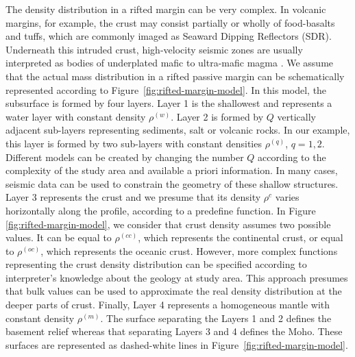 \documentclass[manuscript]{geophysics}
\begin{document}
The density distribution in a rifted margin can be very complex.
In volcanic margins, for example, the crust may consist partially or wholly of 
food-basalts and tuffs, which are commonly imaged as Seaward Dipping Reflectors (SDR).
Underneath this intruded crust, high-velocity seismic zones are usually interpreted 
as bodies of underplated mafic to ultra-mafic magma \citep{geoffroy2005}.
We assume that the actual mass distribution in a rifted passive margin can be 
schematically represented according to Figure~\ref{fig:rifted-margin-model}. 
In this model, the subsurface is formed by four layers. 
Layer 1 is the shallowest and represents a water layer with constant density
$\rho^{(w)}$. 
Layer 2 is formed by $Q$ vertically adjacent sub-layers representing 
sediments, salt or volcanic rocks.
In our example, this layer is formed by two sub-layers with constant densities
$\rho^{(q)}$, $q = 1, 2$. Different models can be created by changing the number $Q$
according to the complexity of the study area and available a priori information.
In many cases, seismic data can be used to constrain the geometry of these 
shallow structures.
Layer 3 represents the crust and we presume that its density $\rho^{c}$
varies horizontally along the profile, according to a predefine function.
In Figure \ref{fig:rifted-margin-model}, we consider that crust density assumes 
two possible values. It can be equal to $\rho^{(cc)}$, which
represents the continental crust, or equal to $\rho^{(oc)}$, which represents the
oceanic crust.
However, more complex functions representing the crust density distribution can be
specified according to interpreter's knowledge about the geology at study area.
This approach presumes that bulk values can be used 
to approximate the real density distribution at the deeper parts of crust. 
Finally, Layer 4 represents a homogeneous mantle with constant density $\rho^{(m)}$. 
The surface separating the Layers 1 and 2 defines the basement relief whereas
that separating Layers 3 and 4 defines the Moho. These surfaces are
represented as dashed-white lines in Figure~\ref{fig:rifted-margin-model}.
\end{document}
